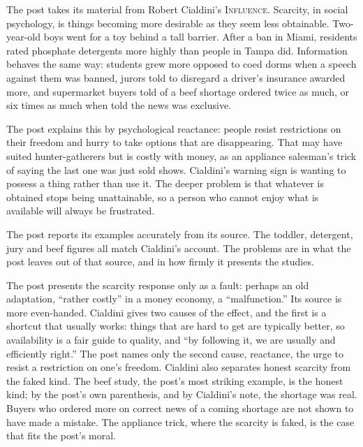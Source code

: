 \begin{afterword}
\summaryhead

The post takes its material from Robert Cialdini's \textsc{Influence}. Scarcity, in social psychology, is things becoming more desirable as they seem less obtainable. Two-year-old boys went for a toy behind a tall barrier. After a ban in Miami, residents rated phosphate detergents more highly than people in Tampa did. Information behaves the same way: students grew more opposed to coed dorms when a speech against them was banned, jurors told to disregard a driver's insurance awarded more, and supermarket buyers told of a beef shortage ordered twice as much, or six times as much when told the news was exclusive.

The post explains this by psychological reactance: people resist restrictions on their freedom and hurry to take options that are disappearing. That may have suited hunter-gatherers but is costly with money, as an appliance salesman's trick of saying the last one was just sold shows. Cialdini's warning sign is wanting to possess a thing rather than use it. The deeper problem is that whatever is obtained stops being unattainable, so a person who cannot enjoy what is available will always be frustrated.

\responsehead

The post reports its examples accurately from its source. The toddler, detergent, jury and beef figures all match Cialdini's account. The problems are in what the post leaves out of that source, and in how firmly it presents the studies.

The post presents the scarcity response only as a fault: perhaps an old adaptation, ``rather costly'' in a money economy, a ``malfunction.'' Its source is more even-handed. Cialdini gives two causes of the effect, and the first is a shortcut that usually works: things that are hard to get are typically better, so availability is a fair guide to quality, and ``by following it, we are usually and efficiently right.'' The post names only the second cause, reactance, the urge to resist a restriction on one's freedom. Cialdini also separates honest scarcity from the faked kind. The beef study, the post's most striking example, is the honest kind; by the post's own parenthesis, and by Cialdini's note, the shortage was real. Buyers who ordered more on correct news of a coming shortage are not shown to have made a mistake. The appliance trick, where the scarcity is faked, is the case that fits the post's moral.


\end{afterword}
